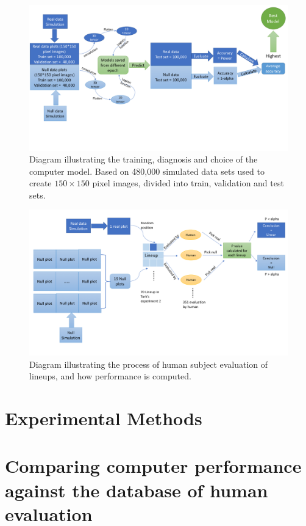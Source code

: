 \documentclass[12pt]{article}
\begin{document}
\begin{figure}[h]
\centerline{\includegraphics[width=15cm]{figures/diagpc.png}}
\caption{Diagram illustrating the training, diagnosis and choice of the computer model. Based on 480,000 simulated data sets used to create $150\times 150$ pixel images, divided into train, validation and test sets.}
\label{dgpc}
\end{figure}

\begin{figure}[h]
\centerline{\includegraphics[width=15cm]{figures/diaghm.png}}
\caption{Diagram illustrating the process of human subject evaluation of lineups, and how performance is computed.}
\label{dghm}
\end{figure}

\section{Experimental Methods}
\label{sec:experiment}

\section{Comparing computer performance against the database of human
evaluation}\label{comparing-computer-performance-against-the-database-of-human-evaluation}
\end{document}
